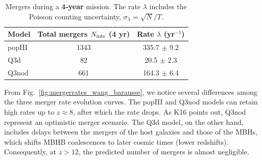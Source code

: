 \documentclass[a4paper,12pt]{article}
\begin{document}
\begin{table}[t]
\captionsetup{font=footnotesize}
\centering
\caption{Mergers during a \textbf{4-year} mission. The rate $\lambda$ includes the Poisson counting uncertainty, $\sigma_{\lambda}=\sqrt{N}/T$.}
\footnotesize
\setlength{\tabcolsep}{4pt}
\label{tab:intrinsic_mergers_4yr}
\begin{threeparttable}
\begin{tabular}{l S[table-format=5.0] S[table-format=3.2]}
\toprule
\textbf{Model} & {Total mergers $N_{\rm intr}$ (4 yr)} & {Rate $\lambda$ (yr$^{-1}$)} \\
\midrule
popIII & 1343 & 335.7 $\pm$ 9.2 \\
Q3d    & 82 & 20.5 $\pm$ 2.3 \\
Q3nod  & 661 & 164.3 $\pm$ 6.4\\
\bottomrule
\end{tabular}
\end{threeparttable}
\label{table:intrinsic_merger_rate}
\end{table}

From Fig.~\ref{fig:mergerrates_wang_barausse}, we notice several differences among the three merger rate evolution curves. The popIII and Q3nod models can retain high rates up to $z\approx8$, after which the rate drops. As K16 points out, Q3nod represent an optimistic merger scenario. The Q3d model, on the other hand, includes delays between the mergers of the host galaxies and those of the MBHs, which shifts MBHB coalescences to later cosmic times (lower redshifts). Consequently, at $z>12$, the predicted number of mergers is almost negligible.
\end{document}
